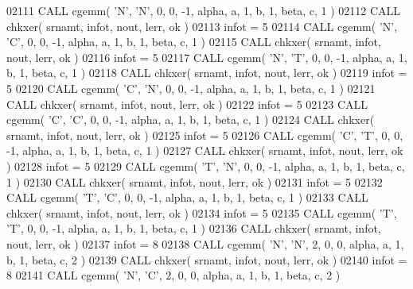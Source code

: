 \begin{DoxyCode}
02111       \textcolor{keyword}{CALL }cgemm( \textcolor{stringliteral}{'N'}, \textcolor{stringliteral}{'N'}, 0, 0, -1, alpha, a, 1, b, 1, beta, c, 1 )
02112       \textcolor{keyword}{CALL }chkxer( srnamt, infot, nout, lerr, ok )
02113       infot = 5
02114       \textcolor{keyword}{CALL }cgemm( \textcolor{stringliteral}{'N'}, \textcolor{stringliteral}{'C'}, 0, 0, -1, alpha, a, 1, b, 1, beta, c, 1 )
02115       \textcolor{keyword}{CALL }chkxer( srnamt, infot, nout, lerr, ok )
02116       infot = 5
02117       \textcolor{keyword}{CALL }cgemm( \textcolor{stringliteral}{'N'}, \textcolor{stringliteral}{'T'}, 0, 0, -1, alpha, a, 1, b, 1, beta, c, 1 )
02118       \textcolor{keyword}{CALL }chkxer( srnamt, infot, nout, lerr, ok )
02119       infot = 5
02120       \textcolor{keyword}{CALL }cgemm( \textcolor{stringliteral}{'C'}, \textcolor{stringliteral}{'N'}, 0, 0, -1, alpha, a, 1, b, 1, beta, c, 1 )
02121       \textcolor{keyword}{CALL }chkxer( srnamt, infot, nout, lerr, ok )
02122       infot = 5
02123       \textcolor{keyword}{CALL }cgemm( \textcolor{stringliteral}{'C'}, \textcolor{stringliteral}{'C'}, 0, 0, -1, alpha, a, 1, b, 1, beta, c, 1 )
02124       \textcolor{keyword}{CALL }chkxer( srnamt, infot, nout, lerr, ok )
02125       infot = 5
02126       \textcolor{keyword}{CALL }cgemm( \textcolor{stringliteral}{'C'}, \textcolor{stringliteral}{'T'}, 0, 0, -1, alpha, a, 1, b, 1, beta, c, 1 )
02127       \textcolor{keyword}{CALL }chkxer( srnamt, infot, nout, lerr, ok )
02128       infot = 5
02129       \textcolor{keyword}{CALL }cgemm( \textcolor{stringliteral}{'T'}, \textcolor{stringliteral}{'N'}, 0, 0, -1, alpha, a, 1, b, 1, beta, c, 1 )
02130       \textcolor{keyword}{CALL }chkxer( srnamt, infot, nout, lerr, ok )
02131       infot = 5
02132       \textcolor{keyword}{CALL }cgemm( \textcolor{stringliteral}{'T'}, \textcolor{stringliteral}{'C'}, 0, 0, -1, alpha, a, 1, b, 1, beta, c, 1 )
02133       \textcolor{keyword}{CALL }chkxer( srnamt, infot, nout, lerr, ok )
02134       infot = 5
02135       \textcolor{keyword}{CALL }cgemm( \textcolor{stringliteral}{'T'}, \textcolor{stringliteral}{'T'}, 0, 0, -1, alpha, a, 1, b, 1, beta, c, 1 )
02136       \textcolor{keyword}{CALL }chkxer( srnamt, infot, nout, lerr, ok )
02137       infot = 8
02138       \textcolor{keyword}{CALL }cgemm( \textcolor{stringliteral}{'N'}, \textcolor{stringliteral}{'N'}, 2, 0, 0, alpha, a, 1, b, 1, beta, c, 2 )
02139       \textcolor{keyword}{CALL }chkxer( srnamt, infot, nout, lerr, ok )
02140       infot = 8
02141       \textcolor{keyword}{CALL }cgemm( \textcolor{stringliteral}{'N'}, \textcolor{stringliteral}{'C'}, 2, 0, 0, alpha, a, 1, b, 1, beta, c, 2 )

\end{DoxyCode}
